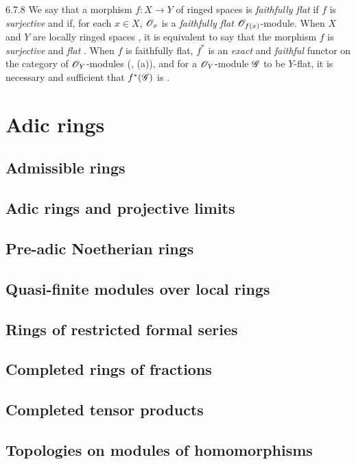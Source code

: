 \begin{env}{6.7.8}
\label{env-0.6.7.8}
We say that a morphism $f:X\to Y$ of ringed spaces is \emph{faithfully flat} if $f$ is
\emph{surjective} and if, for each $x\in X$, $\mathscr{O}_x$ is a \emph{faithfully flat}
$\mathscr{O}_{f(x)}$-module. When $X$ and $Y$ are locally ringed spaces , it is
equivalent to say that the morphism $f$ is \emph{surjective} and \emph{flat}
. When $f$ is faithfully flat, $f^*$ is an \emph{exact} and \emph{faithful}
functor on the category of $\mathscr{O}_Y$-modules (, (a)), and for a $\mathscr{O}_Y$-module
$\mathscr{G}$ to be $Y$-flat, it is necessary and sufficient that $f^*(\mathscr{G})$ is
.
\end{env}

\section{Adic rings}
\label{0-prelim-7}

\subsection{Admissible rings}
\label{0-prelim-7.1}

\subsection{Adic rings and projective limits}
\label{0-prelim-7.2}

\subsection{Pre-adic Noetherian rings}
\label{0-prelim-7.3}

\subsection{Quasi-finite modules over local rings}
\label{0-prelim-7.4}

\subsection{Rings of restricted formal series}
\label{0-prelim-7.5}

\subsection{Completed rings of fractions}
\label{0-prelim-7.6}

\subsection{Completed tensor products}
\label{0-prelim-7.7}

\subsection{Topologies on modules of homomorphisms}
\label{0-prelim-7.8}

